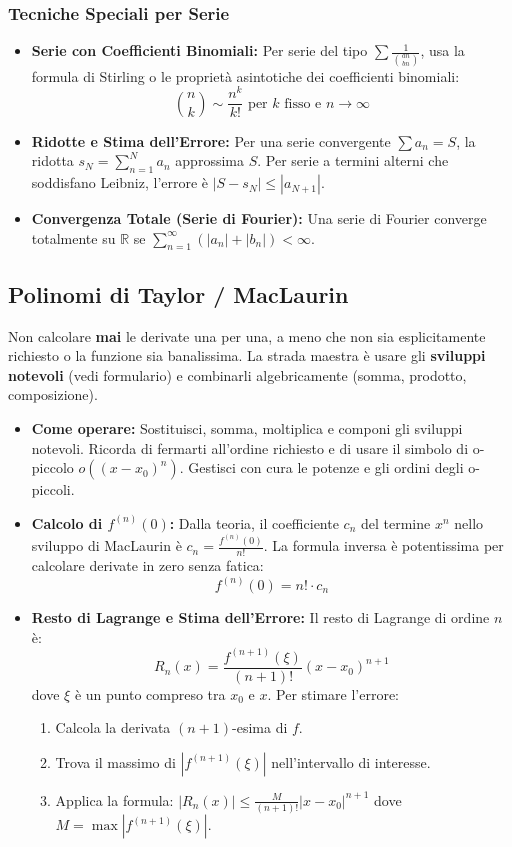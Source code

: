 \documentclass[a4paper, 12pt]{article}
\begin{document}
\subsubsection{Tecniche Speciali per Serie}
\begin{itemize}
    \item \textbf{Serie con Coefficienti Binomiali:} Per serie del tipo \(\sum \frac{1}{\binom{an}{bn}}\), usa la formula di Stirling o le proprietà asintotiche dei coefficienti binomiali:
    \[ \binom{n}{k} \sim \frac{n^k}{k!} \text{ per } k \text{ fisso e } n \to \infty \]
    \item \textbf{Ridotte e Stima dell'Errore:} Per una serie convergente \(\sum a_n = S\), la ridotta \(s_N = \sum_{n=1}^N a_n\) approssima \(S\). Per serie a termini alterni che soddisfano Leibniz, l'errore è \(|S - s_N| \leq |a_{N+1}|\).
    \item \textbf{Convergenza Totale (Serie di Fourier):} Una serie di Fourier converge totalmente su \(\mathbb{R}\) se \(\sum_{n=1}^{\infty} (|a_n| + |b_n|) < \infty\).
\end{itemize}

\subsection{Polinomi di Taylor / MacLaurin}
\begin{strategia}
Non calcolare \textbf{mai} le derivate una per una, a meno che non sia esplicitamente richiesto o la funzione sia banalissima. La strada maestra è usare gli \textbf{sviluppi notevoli} (vedi formulario) e combinarli algebricamente (somma, prodotto, composizione).
\end{strategia}
\begin{itemize}
    \item \textbf{Come operare:} Sostituisci, somma, moltiplica e componi gli sviluppi notevoli. Ricorda di fermarti all'ordine richiesto e di usare il simbolo di o-piccolo \(o((x-x_0)^n)\). Gestisci con cura le potenze e gli ordini degli o-piccoli.
    \item \textbf{Calcolo di \texorpdfstring{\(f^{(n)}(0)\)}{f\^(n)(0)}:} Dalla teoria, il coefficiente \(c_n\) del termine \(x^n\) nello sviluppo di MacLaurin è \(c_n = \frac{f^{(n)}(0)}{n!}\). La formula inversa è potentissima per calcolare derivate in zero senza fatica: 
    \[ f^{(n)}(0) = n! \cdot c_n \]
    \item \textbf{Resto di Lagrange e Stima dell'Errore:} Il resto di Lagrange di ordine \(n\) è:
    \[ R_n(x) = \frac{f^{(n+1)}(\xi)}{(n+1)!}(x-x_0)^{n+1} \]
    dove \(\xi\) è un punto compreso tra \(x_0\) e \(x\). Per stimare l'errore:
    \begin{enumerate}
        \item Calcola la derivata \((n+1)\)-esima di \(f\).
        \item Trova il massimo di \(|f^{(n+1)}(\xi)|\) nell'intervallo di interesse.
        \item Applica la formula: \(|R_n(x)| \le \frac{M}{(n+1)!}|x-x_0|^{n+1}\) dove \(M = \max |f^{(n+1)}(\xi)|\).
    \end{enumerate}
\end{itemize}
\end{document}
